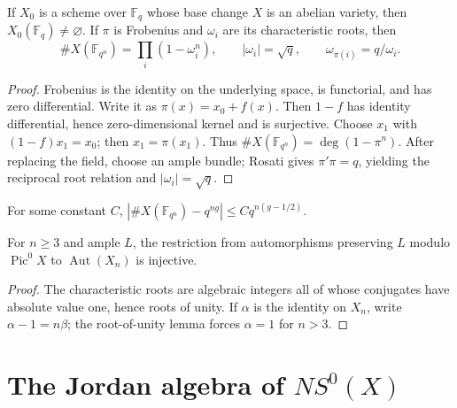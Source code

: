\begin{theorem}
\label{mumford-thm-lang-frobenius-rh}
If $X_0$ is a scheme over $\mathbb F_q$ whose base change $X$ is an abelian
variety, then $X_0(\mathbb F_q)\ne\varnothing$. If $\pi$ is Frobenius and
$\omega_i$ are its characteristic roots, then
\[
\#X(\mathbb F_{q^n})=\prod_i(1-\omega_i^n),
\qquad |\omega_i|=\sqrt q,
\qquad \omega_{\pi(i)}=q/\omega_i.
\]
\end{theorem}
\begin{proof}
Frobenius is the identity on the underlying space, is functorial, and has
zero differential. Write it as $\pi(x)=x_0+f(x)$. Then $1-f$ has identity
differential, hence zero-dimensional kernel and is surjective. Choose
$x_1$ with $(1-f)x_1=x_0$; then $x_1=\pi(x_1)$.
Thus $\#X(\mathbb F_{q^n})=\deg(1-\pi^n)$. After replacing the field,
choose an ample bundle; Rosati gives $\pi'\pi=q$, yielding the reciprocal
root relation and $|\omega_i|=\sqrt q$.
\end{proof}

\begin{corollary}
\label{mumford-cor-weil-point-count-estimate}
For some constant $C$,
$|\#X(\mathbb F_{q^n})-q^{ng}|\le Cq^{n(g-1/2)}$.
\end{corollary}

\begin{theorem}
\label{mumford-thm-serre-torsion-restriction}
For $n\ge3$ and ample $L$, the restriction from automorphisms preserving
$L$ modulo $\operatorname{Pic}^0X$ to $\operatorname{Aut}(X_n)$ is injective.
\end{theorem}
\begin{proof}
The characteristic roots are algebraic integers all of whose conjugates
have absolute value one, hence roots of unity. If $\alpha$ is the identity
on $X_n$, write $\alpha-1=n\beta$; the root-of-unity lemma forces
$\alpha=1$ for $n>3$.
\end{proof}

\section{The Jordan algebra of $NS^0(X)$}
\label{mumford-IV21-jordan-source}

